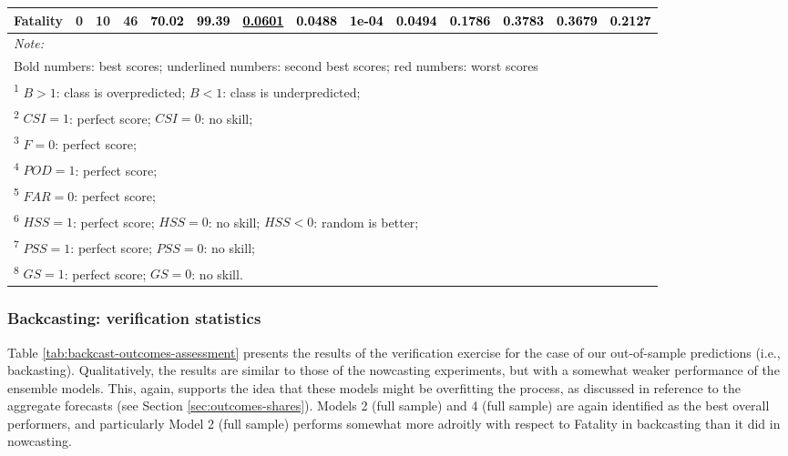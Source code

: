 \documentclass[]{elsarticle} %
\begin{document}
\begin{table}
{\begin{tabular}[t]{lrrrllllllllll}
Fatality & 0 & 10 & 46 & \multirow{-3}{*}{\raggedright\arraybackslash \textcolor{black}{70.02}} & \textcolor{black}{99.39} & \textcolor{black}{\underline{0.0601}} & \textcolor{black}{\textbf{0.0488}} & \textcolor{black}{\textbf{1e-04}} & \textcolor{black}{\textbf{0.0494}} & \textcolor{black}{\textbf{0.1786}} & \multirow{-3}{*}{\raggedright\arraybackslash \textcolor{black}{0.3783}} & \multirow{-3}{*}{\raggedright\arraybackslash \textcolor{black}{0.3679}} & \multirow{-3}{*}{\raggedright\arraybackslash \textcolor{black}{0.2127}}\\
\bottomrule
\multicolumn{14}{l}{\textit{Note: }}\\
\multicolumn{14}{l}{Bold numbers: best scores; underlined numbers: second best scores; red numbers: worst scores}\\
\multicolumn{14}{l}{\textsuperscript{1} $B>1$: class is overpredicted; $B<1$: class is underpredicted; }\\
\multicolumn{14}{l}{\textsuperscript{2} $CSI = 1$: perfect score; $CSI = 0$: no skill; }\\
\multicolumn{14}{l}{\textsuperscript{3} $F = 0$: perfect score; }\\
\multicolumn{14}{l}{\textsuperscript{4} $POD = 1$: perfect score; }\\
\multicolumn{14}{l}{\textsuperscript{5} $FAR = 0$: perfect score; }\\
\multicolumn{14}{l}{\textsuperscript{6} $HSS = 1$: perfect score; $HSS = 0$: no skill; $HSS < 0$: random is better; }\\
\multicolumn{14}{l}{\textsuperscript{7} $PSS = 1$: perfect score; $PSS = 0$: no skill; }\\
\multicolumn{14}{l}{\textsuperscript{8} $GS = 1$: perfect score; $GS = 0$: no skill.}\\
\end{tabular}}
\end{table}

\hypertarget{backcasting-verification-statistics}{%
\subsubsection{Backcasting: verification
statistics}\label{backcasting-verification-statistics}}

Table \ref{tab:backcast-outcomes-assessment} presents the results of the
verification exercise for the case of our out-of-sample predictions
(i.e., backasting). Qualitatively, the results are similar to those of
the nowcasting experiments, but with a somewhat weaker performance of
the ensemble models. This, again, supports the idea that these models
might be overfitting the process, as discussed in reference to the
aggregate forecasts (see Section \ref{sec:outcomes-shares}). Models 2
(full sample) and 4 (full sample) are again identified as the best
overall performers, and particularly Model 2 (full sample) performs
somewhat more adroitly with respect to Fatality in backcasting than it
did in nowcasting.
\end{document}

